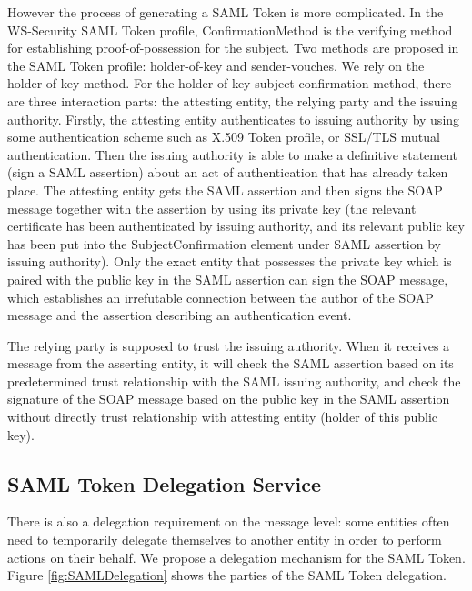 \documentclass[twocolumn]{svjour3}         %
\begin{document}
However the process of generating a SAML Token is more complicated. In the WS-Security SAML Token profile, ConfirmationMethod is the verifying method for establishing proof-of-possession for the subject. Two methods are proposed in the SAML Token profile: holder-of-key and sender-vouches. We rely on the holder-of-key method. For the holder-of-key subject confirmation method, there are three interaction parts: the attesting entity, the relying party and the issuing authority. Firstly, the attesting entity authenticates to issuing authority by using some authentication scheme such as X.509 Token profile, or SSL/TLS mutual authentication. Then the issuing authority is able to make a definitive statement (sign a SAML assertion) about an act of authentication that has already taken place. The attesting entity gets the SAML assertion and then signs the SOAP message together with the assertion by using its private key (the relevant certificate has been authenticated by issuing authority, and its relevant public key has been put into the SubjectConfirmation element under SAML assertion by issuing authority). Only the exact entity that possesses the private key which is paired with the public key in the SAML assertion can sign the SOAP message, which establishes an irrefutable connection between the author of the SOAP message and the assertion describing an authentication event.

The relying party is supposed to trust the issuing authority. When it receives a message from the asserting entity, it will check the SAML assertion based on its predetermined trust relationship with the SAML issuing authority, and check the signature of the SOAP message based on the public key in the SAML assertion without directly trust relationship with attesting entity (holder of this public key).


\subsection{SAML Token Delegation Service}
\label{sec:samldeleg}
There is also a delegation requirement on the message level: some entities often need to temporarily delegate themselves to another entity in order to perform actions on their behalf. We propose a delegation mechanism for the SAML Token. Figure \ref{fig:SAMLDelegation} shows the parties of the SAML Token delegation.
\end{document}
